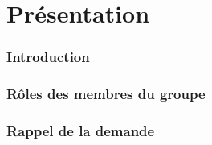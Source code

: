 \part{Présentation}
\section{Introduction}
\section{Rôles des membres du groupe}
\section{Rappel de la demande}
